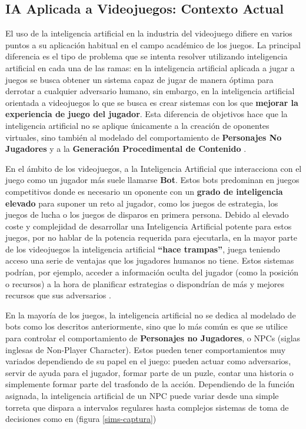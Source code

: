 \subsection{IA Aplicada a Videojuegos: Contexto Actual}
El uso de la inteligencia artificial en la industria del videojuego difiere en varios puntos a su aplicación habitual en el campo académico de los juegos. La principal diferencia es el tipo de problema que se intenta resolver utilizando inteligencia artificial en cada una de las ramas: en la inteligencia artificial aplicada a jugar a juegos se busca obtener un sistema capaz de jugar de manera óptima para derrotar a cualquier adversario humano, sin embargo, en la inteligencia artificial orientada a videojuegos lo que se busca es crear sistemas con los que \textbf{mejorar la experiencia de juego del jugador}. Esta diferencia de objetivos hace que la inteligencia artificial no se aplique únicamente a la creación de oponentes virtuales, sino también al modelado del comportamiento de \textbf{Personajes No Jugadores} y a la \textbf{Generación Procedimental de Contenido} \cite{ai_and_games}.

En el ámbito de los videojuegos, a la Inteligencia Artificial que interacciona con el juego como un jugador más suele llamarse \textbf{Bot}. Estos bots predominan en juegos competitivos donde es necesario un oponente con un \textbf{grado de inteligencia elevado} para suponer un reto al jugador, como los juegos de estrategia, los juegos de lucha o los juegos de disparos en primera persona. Debido al elevado coste y complejidad de desarrollar una Inteligencia Artificial potente para estos juegos, por no hablar de la potencia requerida para ejecutarla, en la mayor parte de los videojuegos la inteligencia artificial \textbf{``hace trampas''}, juega teniendo acceso una serie de ventajas que los jugadores humanos no tiene. Estos sistemas podrían, por ejemplo, acceder a información oculta del jugador (como la posición o recursos) a la hora de planificar estrategias o dispondrían de más y mejores recursos que sus adversarios \cite{ai_and_games}.

En la mayoría de los juegos, la inteligencia artificial no se dedica al modelado de bots como los descritos anteriormente, sino que lo más común es que se utilice para controlar el comportamiento de \textbf{Personajes no Jugadores}, o NPCs (siglas inglesas de Non-Player Character). Estos pueden tener comportamientos muy variados dependiendo de su papel en el juego: pueden actuar como adversarios, servir de ayuda para el jugador, formar parte de un puzle, contar una historia o simplemente formar parte del trasfondo de la acción. Dependiendo de la función asignada, la inteligencia artificial de un NPC puede variar desde una simple torreta que dispara a intervalos regulares hasta complejos sistemas de toma de decisiones como en  (figura \ref{sims-captura})

